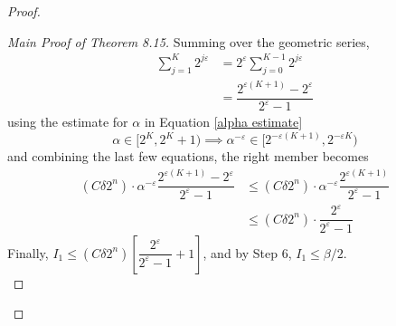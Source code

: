 \documentclass[../../main.tex]{subfiles}
\begin{document}
\begin{proof}
\begin{proof}[Main Proof of Theorem 8.15]
    Summing over the geometric series,
    \begin{align*}
        \sum_{j=1}^K2^{j\varepsilon}&=2^{\varepsilon}\sum^{K-1}_{j=0}2^{j\varepsilon}\\[2ex]
        &=\dfrac{2^{\varepsilon(K+1)}-2^{\varepsilon}}{2^{\varepsilon}-1}
    \end{align*}
    using the estimate for $\alpha$ in Equation \eqref{alpha estimate} 
    \[\alpha\in [2^K,2^K+1)\implies\alpha^{-\varepsilon}\in[2^{-\varepsilon(K+1)},2^{-\varepsilon K})\]
    and combining the last few equations, the right member becomes
    \begin{align*}
        (C\delta 2^n)\cdot \alpha^{-\varepsilon}\dfrac{2^{\varepsilon(K+1)}-2^{\varepsilon}}{2^{\varepsilon}-1}&\leq (C\delta 2^n)\cdot \alpha^{-\varepsilon}\dfrac{2^{\varepsilon(K+1)}}{2^{\varepsilon}-1}\\[2ex]
        &\leq (C\delta 2^n)\cdot \dfrac{2^{\varepsilon}}{2^{\varepsilon}-1}
    \end{align*}
    Finally, $I_1\leq (C\delta 2^n)\left[\dfrac{2^\varepsilon}{2^\varepsilon-1}+1\right]$, and by Step 6, $I_1\leq \beta/2$.\\


\end{proof}
\end{proof}
\end{document}
